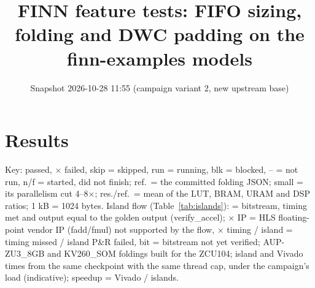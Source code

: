 \documentclass[a4paper,10pt]{article}
\title{FINN feature tests: FIFO sizing, folding and DWC padding on the finn-examples models}
\date{Snapshot 2026-10-28 11:55 (campaign variant 2, new upstream base)}
\begin{document}
\maketitle
\section*{Results}
Key: \checkmark{} passed, $\times$ failed, skip = skipped, run = running, blk = blocked, -- = not run, n/f = started, did not finish; ref.\ = the committed folding JSON; small = its parallelism cut 4--8$\times$; res./ref.\ = mean of the LUT, BRAM, URAM and DSP ratios; 1 kB = 1024 bytes.
Island flow (Table~\ref{tab:islands}): \checkmark{} = bitstream, timing met and output equal to the golden output (verify\_accel); $\times$ IP = HLS floating-point vendor IP (fadd/fmul) not supported by the flow, $\times$ timing / island = timing missed / island P\&R failed, bit = bitstream not yet verified; AUP-ZU3\_8GB and KV260\_SOM foldings built for the ZCU104; island and Vivado times from the same checkpoint with the same thread cap, under the campaign's load (indicative); speedup = Vivado / islands.
\end{document}
